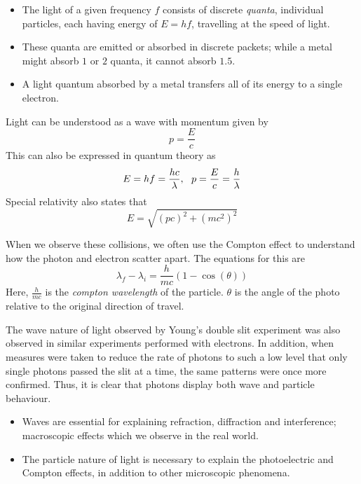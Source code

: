 \documentclass[12pt]{report}
\begin{document}
\begin{flushleft}
\begin{itemize}
    \item The light of a given frequency \(f\) consists of discrete
        \textit{quanta}, individual particles, each having energy of
        \(E = hf\), travelling at the speed of light.
    \item These quanta are emitted or absorbed in discrete packets; while
        a metal might absorb \(1\) or \(2\) quanta, it cannot absorb \(1.5\).
    \item A light quantum absorbed by a metal transfers all of its energy to a
        single electron.
\end{itemize}

Light can be understood as a wave with momentum given by
\[p = \frac{E}{c}\]
This can also be expressed in quantum theory as
\[E = hf = \frac{hc}{\lambda} , \:\:\: p = \frac{E}{c} = \frac{h}{\lambda}\]
Special relativity also states that
\[E = \sqrt{(pc)^2 + (mc^2)^2}\]

\bigskip
When we observe these collisions, we often use the Compton effect to understand
how the photon and electron scatter apart. The equations for this are
\[\lambda_f - \lambda_i = \frac{h}{mc}(1 - \cos(\theta))\]
Here, \(\frac{h}{mc}\) is the \textit{compton wavelength} of the particle.
\(\theta\) is the angle of the photo relative to the original direction of
travel.

\bigskip
The wave nature of light observed by Young's double slit experiment was also
observed in similar experiments performed with electrons. In addition, when
measures were taken to reduce the rate of photons to such a low level that only
single photons passed the slit at a time, the same patterns were once more
confirmed. Thus, it is clear that photons display both wave and particle
behaviour.

\begin{itemize}
    \item Waves are essential for explaining refraction, diffraction and
        interference; macroscopic effects which we observe in the real world.
    \item The particle nature of light is necessary to explain the
        photoelectric and Compton effects, in addition to other microscopic 
        phenomena.
\end{itemize}

\end{flushleft}
\end{document}

